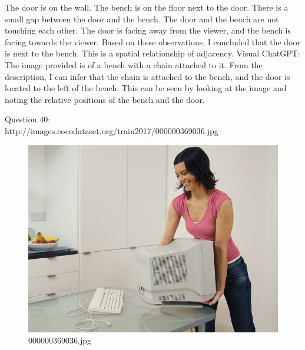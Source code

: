 \begin{enumerate}
        The door is on the wall.
        The bench is on the floor next to the door.
        There is a small gap between the door and the bench.
        The door and the bench are not touching each other.
        The door is facing away from the viewer, and the bench is facing towards the viewer.
        Based on these observations, I concluded that the door is next to the bench. This is a spatial relationship of adjacency.
        \subitem Visual ChatGPT: The image provided is of a bench with a chain attached to it. From the description, I can infer that the chain is attached to the bench, and the door is located to the left of the bench. This can be seen by looking at the image and noting the relative positions of the bench and the door.
    \end{enumerate}
    Question 40:\\http://images.cocodataset.org/train2017/000000369036.jpg
    \begin{figure}[h]
        \centering
        \includegraphics[width=0.8\linewidth]{../image set/easy/000000369036.jpg}
        \caption{000000369036.jpg}
    \end{figure}
